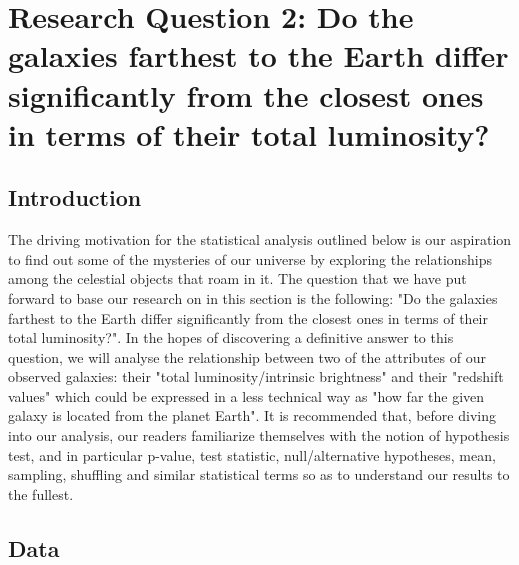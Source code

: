 \documentclass[12pt]{article}
\begin{document}
\newpage

\section{Research Question 2: Do the galaxies farthest to the Earth differ significantly from the closest ones in terms of their total luminosity?}

\subsection{Introduction}

The driving motivation for the statistical analysis outlined below is our aspiration to find out some of the mysteries of our universe by exploring the relationships among the celestial objects that roam in it. The question that we have put forward to base our research on in this section is the following: "Do the galaxies farthest to the Earth differ significantly from the closest ones in terms of their total luminosity?". In the hopes of discovering a definitive answer to this question, we will analyse the relationship between two of the attributes of our observed galaxies: their "total luminosity/intrinsic brightness" and their "redshift values" which could be expressed in a less technical way as "how far the given galaxy is located from the planet Earth". It is recommended that, before diving into our analysis, our readers familiarize themselves with the notion of hypothesis test, and in particular p-value, test statistic, null/alternative hypotheses, mean, sampling, shuffling and similar statistical terms so as to understand our results to the fullest.

\subsection{Data}
\end{document}
